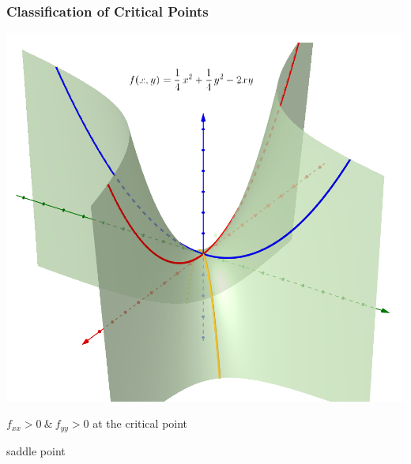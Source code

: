 \documentclass[10pt]{beamer}
\begin{document}
\begin{frame}
\frametitle{Classification of Critical Points}
\centering
\includegraphics[width=.65\textwidth]{saddlepoint.png}

$f_{xx} >0\ \&\ f_{yy} > 0$ at the critical point

saddle point
\end{frame}
\end{document}

